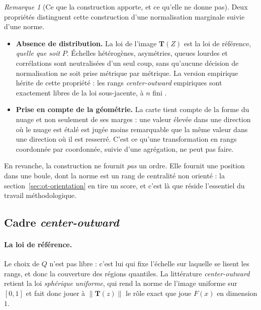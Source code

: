 \documentclass[11pt,a4paper]{article}
\theoremstyle{definition}
\theoremstyle{remark}
\newtheorem{remarque}{Remarque}[section]
\newcommand{\norm}[1]{\left\lVert #1 \right\rVert}
\newcommand{\Tmap}{\mathbf{T}}
\begin{document}
\begin{remarque}[Ce que la construction apporte, et ce qu'elle ne donne pas]
  \label{rem:ot-apport}
  Deux propriétés distinguent cette construction d'une normalisation marginale suivie
  d'une norme.

  \medskip

  \begin{itemize}[nosep,leftmargin=1.4em]
    \item \textbf{Absence de distribution.} La loi de l'image $\Tmap(Z)$ est la loi de
    référence, \emph{quelle que soit} $P$. Échelles hétérogènes, asymétries, queues lourdes
    et corrélations sont neutralisées d'un seul coup, sans qu'aucune décision de
    normalisation ne soit prise métrique par métrique. La version empirique hérite de cette
    propriété : les rangs \emph{center-outward} empiriques sont exactement libres de la loi
    sous-jacente, à $n$ fini \citep{hallin2021}.
    \item \textbf{Prise en compte de la géométrie.} La carte tient compte de la forme du
    nuage et non seulement de ses marges : une valeur élevée dans une direction où le nuage
    est étalé est jugée moins remarquable que la même valeur dans une direction où il est
    resserré. C'est ce qu'une transformation en rangs coordonnée par coordonnée, suivie
    d'une agrégation, ne peut pas faire.
  \end{itemize}

  \medskip

  En revanche, la construction ne fournit \emph{pas} un ordre. Elle fournit une position
  dans une boule, dont la norme est un rang de centralité non orienté : la
  section~\ref{sec:ot-orientation} en tire un score, et c'est là que réside l'essentiel du
  travail méthodologique.
\end{remarque}

\bigskip

\subsection{Cadre \emph{center-outward}}
\label{sec:ot-cadre}

\medskip

\paragraph{La loi de référence.} Le choix de $Q$ n'est pas libre : c'est lui qui fixe
l'échelle sur laquelle se lisent les rangs, et donc la couverture des régions quantiles.
La littérature \emph{center-outward} retient la loi \emph{sphérique uniforme}, qui rend la
norme de l'image uniforme sur $[0,1]$ et fait donc jouer à $\norm{\Tmap(z)}$ le rôle exact
que joue $F(x)$ en dimension $1$.
\end{document}

